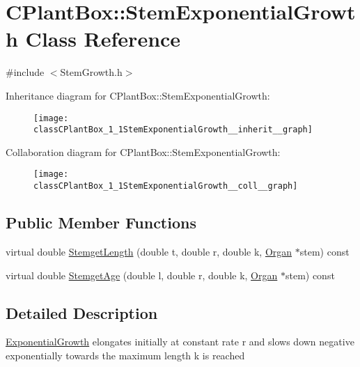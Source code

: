 \hypertarget{classCPlantBox_1_1StemExponentialGrowth}{}\section{C\+Plant\+Box\+:\+:Stem\+Exponential\+Growth Class Reference}
\label{classCPlantBox_1_1StemExponentialGrowth}


{\ttfamily \#include $<$Stem\+Growth.\+h$>$}



Inheritance diagram for C\+Plant\+Box\+:\+:Stem\+Exponential\+Growth\+:\nopagebreak
\begin{figure}[H]
\begin{center}
\leavevmode
\texttt{[image: classCPlantBox\_1\_1StemExponentialGrowth\_\_inherit\_\_graph]}
\end{center}
\end{figure}


Collaboration diagram for C\+Plant\+Box\+:\+:Stem\+Exponential\+Growth\+:\nopagebreak
\begin{figure}[H]
\begin{center}
\leavevmode
\texttt{[image: classCPlantBox\_1\_1StemExponentialGrowth\_\_coll\_\_graph]}
\end{center}
\end{figure}
\subsection*{Public Member Functions}
\begin{DoxyCompactItemize}
\item 
virtual double \hyperlink{classCPlantBox_1_1StemExponentialGrowth_a979dabd31e15e4d4a014b5477301d29c}{Stemget\+Length} (double t, double r, double k, \hyperlink{classCPlantBox_1_1Organ}{Organ} $\ast$stem) const
\item 
virtual double \hyperlink{classCPlantBox_1_1StemExponentialGrowth_a72f33a3ca13bddc934810dbe3d7b7652}{Stemget\+Age} (double l, double r, double k, \hyperlink{classCPlantBox_1_1Organ}{Organ} $\ast$stem) const
\end{DoxyCompactItemize}


\subsection{Detailed Description}
\hyperlink{classCPlantBox_1_1ExponentialGrowth}{Exponential\+Growth} elongates initially at constant rate r and slows down negative exponentially towards the maximum length k is reached 

